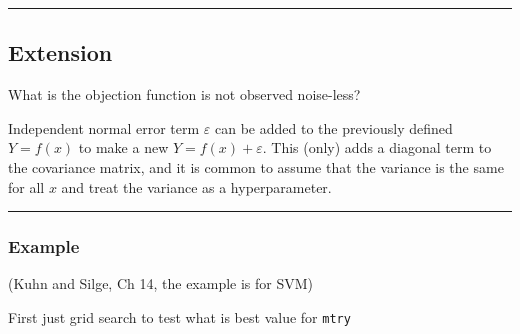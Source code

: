 \documentclass[
  letterpaper,
  DIV=11,
  numbers=noendperiod]{scrartcl}
\begin{document}
\begin{center}\rule{0.5\linewidth}{0.5pt}\end{center}

\hypertarget{extension}{%
\subsection{Extension}\label{extension}}

What is the objection function is not observed noise-less?

Independent normal error term \(\varepsilon\) can be added to the
previously defined \(Y=f(x)\) to make a new \(Y=f(x)+\varepsilon\). This
(only) adds a diagonal term to the covariance matrix, and it is common
to assume that the variance is the same for all \(x\) and treat the
variance as a hyperparameter.

\begin{center}\rule{0.5\linewidth}{0.5pt}\end{center}

\hypertarget{example}{%
\subsubsection{Example}\label{example}}

(Kuhn and Silge, Ch 14, the example is for SVM)

First just grid search to test what is best value for \texttt{mtry}
\end{document}
